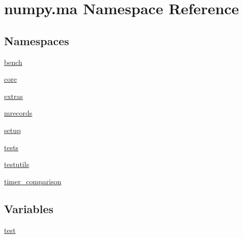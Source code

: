 \hypertarget{namespacenumpy_1_1ma}{}\section{numpy.\+ma Namespace Reference}
\label{namespacenumpy_1_1ma}
\subsection*{Namespaces}
\begin{DoxyCompactItemize}
\item 
 \hyperlink{namespacenumpy_1_1ma_1_1bench}{bench}
\item 
 \hyperlink{namespacenumpy_1_1ma_1_1core}{core}
\item 
 \hyperlink{namespacenumpy_1_1ma_1_1extras}{extras}
\item 
 \hyperlink{namespacenumpy_1_1ma_1_1mrecords}{mrecords}
\item 
 \hyperlink{namespacenumpy_1_1ma_1_1setup}{setup}
\item 
 \hyperlink{namespacenumpy_1_1ma_1_1tests}{tests}
\item 
 \hyperlink{namespacenumpy_1_1ma_1_1testutils}{testutils}
\item 
 \hyperlink{namespacenumpy_1_1ma_1_1timer__comparison}{timer\+\_\+comparison}
\end{DoxyCompactItemize}
\subsection*{Variables}
\begin{DoxyCompactItemize}
\item 
\hyperlink{namespacenumpy_1_1ma_a69031d1783dd0a4d2ce67e6c000ac1ee}{test}
\end{DoxyCompactItemize}


